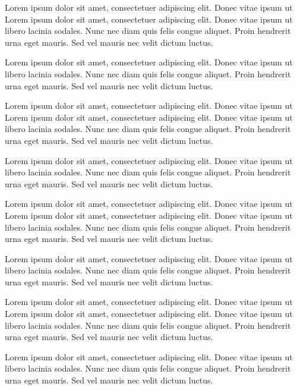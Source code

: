 Lorem ipsum dolor sit amet, consectetuer adipiscing elit. Donec vitae ipsum ut
Lorem ipsum dolor sit amet, consectetuer adipiscing elit. Donec vitae ipsum ut
libero lacinia sodales. Nunc nec diam quis felis congue aliquet. Proin hendrerit
urna eget mauris. Sed vel mauris nec velit dictum luctus.

Lorem ipsum dolor sit amet, consectetuer adipiscing elit. Donec vitae ipsum ut
libero lacinia sodales. Nunc nec diam quis felis congue aliquet. Proin hendrerit
urna eget mauris. Sed vel mauris nec velit dictum luctus.

Lorem ipsum dolor sit amet, consectetuer adipiscing elit. Donec vitae ipsum ut
Lorem ipsum dolor sit amet, consectetuer adipiscing elit. Donec vitae ipsum ut
libero lacinia sodales. Nunc nec diam quis felis congue aliquet. Proin hendrerit
urna eget mauris. Sed vel mauris nec velit dictum luctus.

Lorem ipsum dolor sit amet, consectetuer adipiscing elit. Donec vitae ipsum ut
libero lacinia sodales. Nunc nec diam quis felis congue aliquet. Proin hendrerit
urna eget mauris. Sed vel mauris nec velit dictum luctus.

Lorem ipsum dolor sit amet, consectetuer adipiscing elit. Donec vitae ipsum ut
Lorem ipsum dolor sit amet, consectetuer adipiscing elit. Donec vitae ipsum ut
libero lacinia sodales. Nunc nec diam quis felis congue aliquet. Proin hendrerit
urna eget mauris. Sed vel mauris nec velit dictum luctus.

Lorem ipsum dolor sit amet, consectetuer adipiscing elit. Donec vitae ipsum ut
libero lacinia sodales. Nunc nec diam quis felis congue aliquet. Proin hendrerit
urna eget mauris. Sed vel mauris nec velit dictum luctus.

Lorem ipsum dolor sit amet, consectetuer adipiscing elit. Donec vitae ipsum ut
Lorem ipsum dolor sit amet, consectetuer adipiscing elit. Donec vitae ipsum ut
libero lacinia sodales. Nunc nec diam quis felis congue aliquet. Proin hendrerit
urna eget mauris. Sed vel mauris nec velit dictum luctus.

Lorem ipsum dolor sit amet, consectetuer adipiscing elit. Donec vitae ipsum ut
libero lacinia sodales. Nunc nec diam quis felis congue aliquet. Proin hendrerit
urna eget mauris. Sed vel mauris nec velit dictum luctus.


